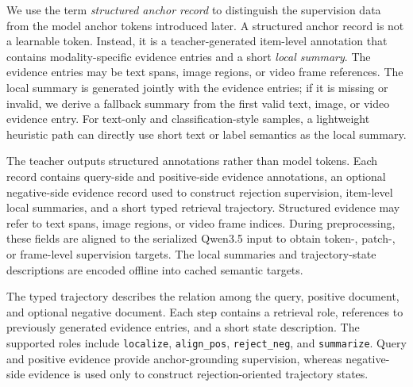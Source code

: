 We use the term \emph{structured anchor record} to distinguish the supervision data from the model anchor tokens introduced later. A structured anchor record is not a learnable token. Instead, it is a teacher-generated item-level annotation that contains modality-specific evidence entries and a short \emph{local summary}. The evidence entries may be text spans, image regions, or video frame references. The local summary is generated jointly with the evidence entries; if it is missing or invalid, we derive a fallback summary from the first valid text, image, or video evidence entry. For text-only and classification-style samples, a lightweight heuristic path can directly use short text or label semantics as the local summary.

The teacher outputs structured annotations rather than model tokens. Each record contains query-side and positive-side evidence annotations, an optional negative-side evidence record used to construct rejection supervision, item-level local summaries, and a short typed retrieval trajectory. Structured evidence may refer to text spans, image regions, or video frame indices. During preprocessing, these fields are aligned to the serialized Qwen3.5 input to obtain token-, patch-, or frame-level supervision targets. The local summaries and trajectory-state descriptions are encoded offline into cached semantic targets.

The typed trajectory describes the relation among the query, positive document, and optional negative document. Each step contains a retrieval role, references to previously generated evidence entries, and a short state description. The supported roles include \texttt{localize}, \texttt{align\_pos}, \texttt{reject\_neg}, and \texttt{summarize}. Query and positive evidence provide anchor-grounding supervision, whereas negative-side evidence is used only to construct rejection-oriented trajectory states.

